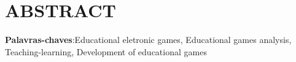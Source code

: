 \noindent\chapter*{\uppercase{Abstract}}

  \lipsum[1-3]

\vspace{1cm}

\noindent \textbf{Palavras-chaves}:Educational eletronic games, Educational games analysis, Teaching-learning, Development of educational games